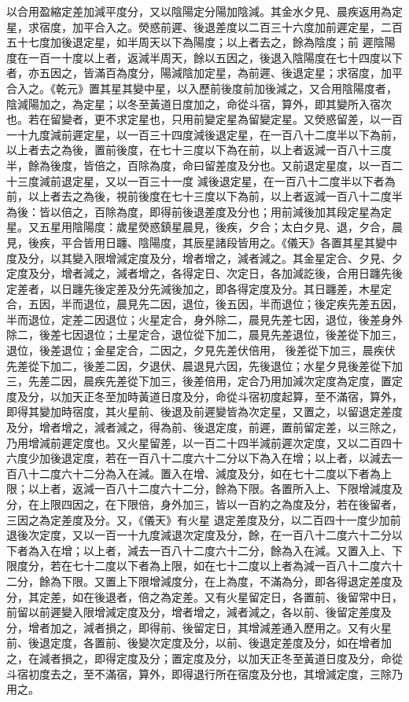 \begin{pinyinscope}
 以合用盈縮定差加減平度分，又以陰陽定分陽加陰減。其金水夕見、晨疾返用為定星，求宿度，加平合入之。熒惑前遲、後退差度以二百三十六度加前遲定星，二百五十七度加後退定星，如半周天以下為陽度；以上者去之，餘為陰度；前
 遲陰陽度在一百一十度以上者，返減半周天，餘以五因之，後退入陰陽度在七十四度以下者，亦五因之，皆滿百為度分，陽減陰加定星，為前遲、後退定星；求宿度，加平合入之。《乾元》置其星其變中星，以入歷前後度前加後減之，又合用陰陽度者，陰減陽加之，為定星；以冬至黃道日度加之，命從斗宿，算外，即其變所入宿次也。若在留變者，更不求定星也，只用前變定星為留變定星。又熒惑留差，以一百一十九度減前遲定星，以一百三十四度減後退定星，在一百八十二度半以下為前，以上者去之為後，置前後度，在七十三度以下為在前，以上者返減一百八十三度半，餘為後度，皆倍之，百除為度，命曰留差度及分也。又前退定星度，以一百二十三度減前退定星，又以一百三十一度
 減後退定星，在一百八十二度半以下者為前，以上者去之為後，視前後度在七十三度以下為前，以上者返減一百八十二度半為後：皆以倍之，百除為度，即得前後退差度及分也；用前減後加其段定星為定星。又五星用陰陽度：歲星熒惑鎮星晨見，後疾，夕合；太白夕見、退，夕合，晨見，後疾，平合皆用日躔、陰陽度，其辰星諸段皆用之。《儀天》各置其星其變中度及分，以其變入限增減定度及分，增者增之，減者減之。其金星定合、夕見、夕定度及分，增者減之，減者增之，各得定日、次定日，各加減訖後，合用日躔先後定差者，以日躔先後定差及分先減後加之，即各得定度及分。其日躔差，木星定合，五因，半而退位，晨見先二因，退位，後五因，半而退位；後定疾先差五因，半而退位，定差二因退位；火星定合，身外除二，晨見先差七因，退位，後差身外除二，後差七因退位；土星定合，退位從下加二，晨見先差退位，後差從下加三，退位，後差退位；金星定合，二因之，夕見先差伏倍用，
 後差從下加三，晨疾伏先差從下加二，後差二因，夕退伏、晨退見六因，先後退位；水星夕見後差從下加三，先差二因，晨疾先差從下加三，後差倍用，定合乃用加減次定度為定度，置定度及分，以加天正冬至加時黃道日度及分，命從斗宿初度起算，至不滿宿，算外，即得其變加時宿度，其火星前、後退及前遲變皆為次定星，又置之，以留退定差度及分，增者增之，減者減之，得為前、後退定度，前遲，置前留定差，以三除之，乃用增減前遲定度也。又火星留差，以一百二十四半減前遲次定度，又以二百四十六度少加後退定度，若在一百八十二度六十二分以下為入在增；以上者，以減去一百八十二度六十二分為入在減。置入在增、減度及分，如在七十二度以下者為上限；以上者，返減一百八十二度六十二分，餘為下限。各置所入上、下限增減度及分，在上限四因之，在下限倍，身外加三，皆以一百約之為度及分，若在後留者，三因之為定差度及分。又，《儀天》有火星
 退定差度及分，以二百四十一度少加前退後次定度，又以一百一十九度減退次定度及分，餘，在一百八十二度六十二分以下者為入在增；以上者，減去一百八十二度六十二分，餘為入在減。又置入上、下限度分，若在七十二度以下者為上限，如在七十二度以上者為減一百八十二度六十二分，餘為下限。又置上下限增減度分，在上為度，不滿為分，即各得退定差度及分，其定差，如在後退者，倍之為定差。又有火星留定日，各置前、後留常中日，前留以前遲變入限增減定度及分，增者增之，減者減之，各以前、後留定差度及分，增者加之，減者損之，即得前、後留定日，其增減差通入歷用之。又有火星前、後退定度，各置前、後變次定度及分，以前、後退定差度及分，如在增者加之，在減者損之，即得定度及分；置定度及分，以加天正冬至黃道日度及分，命從斗宿初度去之，至不滿宿，算外，即得退行所在宿度及分也，其增減定度，三除乃用之。




\end{pinyinscope}
